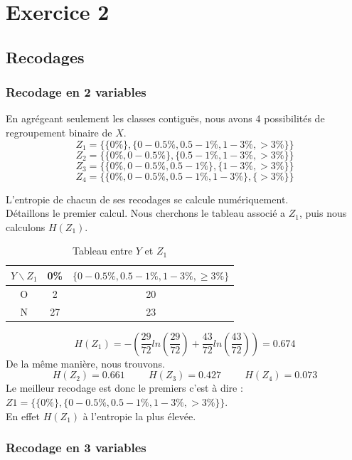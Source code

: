 \documentclass{article}
\begin{document}
\newpage
\section{Exercice 2}
\label{exercice2}
\subsection{Recodages}

\subsubsection{Recodage en 2 variables}

En agrégeant seulement les classes contiguës, nous avons 4 possibilités de regroupement binaire de 
$X$.
\\
 

\[
Z_1 =\{ \{0 \% \} , \{0 - 0.5 \% ,0.5-1 \% ,1-3 \% ,>3 \% \} \}  
\]
\[
Z_2 =\{ \{0 \% , 0 - 0.5 \%  \} , \{0.5-1 \% ,1-3 \% ,>3 \% \} \}
\]
\[
Z_3 =\{ \{0 \%, 0 - 0.5 \% ,0.5-1 \%  \} , \{1-3 \% ,>3 \% \} \}
\]
\[
Z_4 =\{ \{0 \% , 0 - 0.5 \% ,0.5-1 \% ,1-3 \% \} , \{>3 \% \} \}
\]


L'entropie de chacun de ses recodages se calcule numériquement.
\\
Détaillons le premier calcul. Nous cherchons le tableau associé a $Z_1$, puis nous calculons $H(Z_1)$.
\begin{table}[h!]
  \centering
  \caption{Tableau entre $Y$ et $Z_1$}
  \begin{tabular}{|c|c|c|}
  \hline
  $Y \backslash Z_1$ & 0\% & $\{0-0.5\%, 0.5-1\%, 1-3\%, \geq 3\%\}$ \\
  \hline
  O & 2 & 20 \\
  \hline
  N & 27 & 23 \\
  \hline
  \end{tabular}
  \end{table}

\[
H(Z_1) = -\left(\frac{29}{72}ln(\frac{29}{72})+\frac{43}{72}ln(\frac{43}{72})\right) = 0.674
\]
De la même manière, nous trouvons.
\[
H(Z_2) = 0.661 \hspace{1cm} H(Z_3) = 0.427 \hspace{1cm} H(Z_4) = 0.073
\]
Le meilleur recodage est donc le premiers c'est à dire :
$Z1 =\{ \{0 \% \} , \{0 - 0.5 \% ,0.5-1 \% ,1-3 \% ,>3 \% \} \}$.\\
En effet $H(Z_1)$ à l'entropie la plus élevée.


\subsubsection{Recodage en 3 variables}
\end{document}

